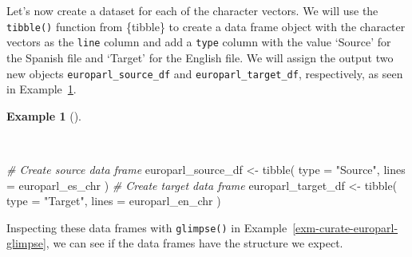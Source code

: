 \documentclass[
  letterpaper,
  krantz1]{latex/krantz-mod}
\newenvironment{Shaded}{\begin{snugshade}}{\end{snugshade}}
\newcommand{\AttributeTok}[1]{\textcolor[rgb]{0.00,0.00,0.00}{#1}}
\newcommand{\CommentTok}[1]{\textcolor[rgb]{0.00,0.00,0.00}{\textit{#1}}}
\newcommand{\FunctionTok}[1]{\textcolor[rgb]{0.00,0.00,0.00}{#1}}
\newcommand{\NormalTok}[1]{\textcolor[rgb]{0.00,0.00,0.00}{#1}}
\newcommand{\OtherTok}[1]{\textcolor[rgb]{0.00,0.00,0.00}{#1}}
\newcommand{\StringTok}[1]{\textcolor[rgb]{0.00,0.00,0.00}{#1}}
\theoremstyle{definition}
\newtheorem{example}{Example}[chapter]
\theoremstyle{definition}
\theoremstyle{remark}
\begin{document}
Let's now create a dataset for each of the character vectors. We will
use the \texttt{tibble()} function from \{tibble\} to create a data
frame object with the character vectors as the \texttt{line} column and
add a \texttt{type} column with the value `Source' for the Spanish file
and `Target' for the English file. We will assign the output two new
objects \texttt{europarl\_source\_df} and \texttt{europarl\_target\_df},
respectively, as seen in Example~\ref{exm-curate-europarl-df}.

\begin{example}[]\protect\hypertarget{exm-curate-europarl-df}{}\label{exm-curate-europarl-df}

~

\begin{Shaded}
\begin{Highlighting}[numbers=left,,]
\CommentTok{\# Create source data frame}
\NormalTok{europarl\_source\_df }\OtherTok{\textless{}{-}}
  \FunctionTok{tibble}\NormalTok{(}
    \AttributeTok{type =} \StringTok{"Source"}\NormalTok{,}
    \AttributeTok{lines =}\NormalTok{ europarl\_es\_chr}
\NormalTok{  )}
\CommentTok{\# Create target data frame}
\NormalTok{europarl\_target\_df }\OtherTok{\textless{}{-}}
  \FunctionTok{tibble}\NormalTok{(}
    \AttributeTok{type =} \StringTok{"Target"}\NormalTok{,}
    \AttributeTok{lines =}\NormalTok{ europarl\_en\_chr}
\NormalTok{  )}
\end{Highlighting}
\end{Shaded}

\end{example}

Inspecting these data frames with \texttt{glimpse()} in
Example~\ref{exm-curate-europarl-glimpse}, we can see if the data frames
have the structure we expect.
\end{document}

